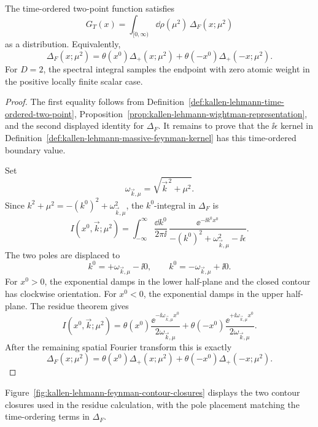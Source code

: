 \begin{proposition}
\label{prop:kallen-lehmann-time-ordered-representation}
The time-ordered two-point function satisfies
\[
  G_T(x)
  =
  \int_{[0,\infty)}
  \dd\rho(\mu^2)\,
  \Delta_F(x;\mu^2)
\]
as a distribution.  Equivalently,
\[
  \Delta_F(x;\mu^2)
  =
  \theta(x^0)\Delta_+(x;\mu^2)
  +
  \theta(-x^0)\Delta_+(-x;\mu^2).
\]
For \(D=2\), the spectral integral samples the endpoint with zero atomic
weight in the positive locally finite scalar case.
\end{proposition}

\begin{proof}
The first equality follows from
Definition~\ref{def:kallen-lehmann-time-ordered-two-point},
Proposition~\ref{prop:kallen-lehmann-wightman-representation}, and the second
displayed identity for \(\Delta_F\).  It remains to prove that the
\(\ii\epsilon\) kernel in
Definition~\ref{def:kallen-lehmann-massive-feynman-kernel} has this
time-ordered boundary value.

Set
\[
  \omega_{\vec k,\mu}=\sqrt{\vec k^{\,2}+\mu^2}.
\]
Since \(k^2+\mu^2=-(k^0)^2+\omega_{\vec k,\mu}^2\), the \(k^0\)-integral in
\(\Delta_F\) is
\[
  I(x^0,\vec k;\mu^2)
  =
  \int_{-\infty}^{\infty}
  \frac{\dd k^0}{2\pi\ii}\,
  \frac{\ee^{-\ii k^0x^0}}
  {-(k^0)^2+\omega_{\vec k,\mu}^2-\ii\epsilon}.
\]
The two poles are displaced to
\[
  k^0=+\omega_{\vec k,\mu}-\ii0,
  \qquad
  k^0=-\omega_{\vec k,\mu}+\ii0.
\]
For \(x^0>0\), the exponential damps in the lower half-plane and the closed
contour has clockwise orientation.  For \(x^0<0\), the exponential damps in
the upper half-plane.  The residue theorem gives
\[
  I(x^0,\vec k;\mu^2)
  =
  \theta(x^0)\frac{\ee^{-\ii\omega_{\vec k,\mu}x^0}}
  {2\omega_{\vec k,\mu}}
  +
  \theta(-x^0)\frac{\ee^{+\ii\omega_{\vec k,\mu}x^0}}
  {2\omega_{\vec k,\mu}}.
\]
After the remaining spatial Fourier transform this is exactly
\[
  \Delta_F(x;\mu^2)
  =
  \theta(x^0)\Delta_+(x;\mu^2)
  +
  \theta(-x^0)\Delta_+(-x;\mu^2).
\]
\end{proof}

Figure~\ref{fig:kallen-lehmann-feynman-contour-closures} displays the two
contour closures used in the residue calculation, with the pole placement
matching the time-ordering terms in \(\Delta_F\).

